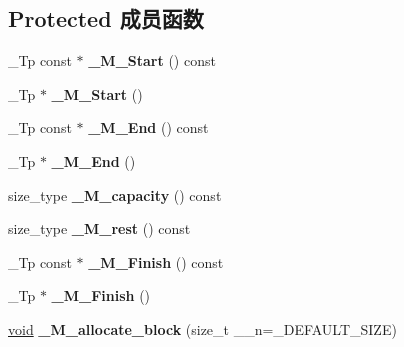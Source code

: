 \subsection*{Protected 成员函数}
\begin{DoxyCompactItemize}
\item 
\mbox{\label{class___string__base_a7058e5f858d62205991d099ad7536ed6}} 
\+\_\+\+Tp const  $\ast$ {\bfseries \+\_\+\+M\+\_\+\+Start} () const
\item 
\mbox{\label{class___string__base_a778a918de00cdf597451343f1d90814b}} 
\+\_\+\+Tp $\ast$ {\bfseries \+\_\+\+M\+\_\+\+Start} ()
\item 
\mbox{\label{class___string__base_a341753e5b9b78d5d352ff3914838b536}} 
\+\_\+\+Tp const  $\ast$ {\bfseries \+\_\+\+M\+\_\+\+End} () const
\item 
\mbox{\label{class___string__base_a04890bac9df670bad1e94932c2122a43}} 
\+\_\+\+Tp $\ast$ {\bfseries \+\_\+\+M\+\_\+\+End} ()
\item 
\mbox{\label{class___string__base_ad6735efdcb777398206024c8b9795d3d}} 
size\+\_\+type {\bfseries \+\_\+\+M\+\_\+capacity} () const
\item 
\mbox{\label{class___string__base_acd7c59a38f02391b704da91c118db093}} 
size\+\_\+type {\bfseries \+\_\+\+M\+\_\+rest} () const
\item 
\mbox{\label{class___string__base_a16448759b1e45a6ceb54708dfa8498c7}} 
\+\_\+\+Tp const  $\ast$ {\bfseries \+\_\+\+M\+\_\+\+Finish} () const
\item 
\mbox{\label{class___string__base_aacba4b7d82e61f40c53eb411f71806f0}} 
\+\_\+\+Tp $\ast$ {\bfseries \+\_\+\+M\+\_\+\+Finish} ()
\item 
\mbox{\label{class___string__base_a876bde083ddb61ea095faa5dd0796ec7}} 
\hyperlink{interfacevoid}{void} {\bfseries \+\_\+\+M\+\_\+allocate\+\_\+block} (size\+\_\+t \+\_\+\+\_\+n=\+\_\+\+D\+E\+F\+A\+U\+L\+T\+\_\+\+S\+I\+ZE)
\item 

\end{DoxyCompactItemize}
